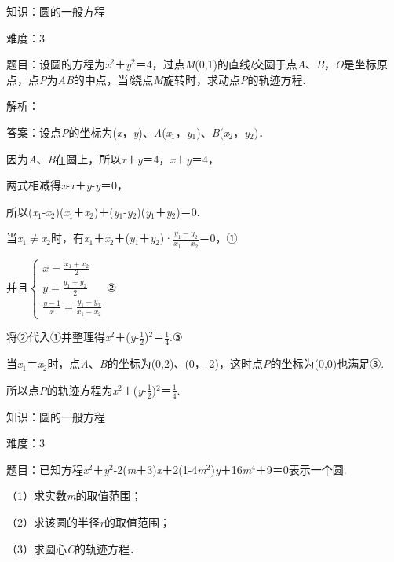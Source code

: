 \documentclass{article} %
\begin{document}
知识：圆的一般方程

难度：3

题目：设圆的方程为\textit{x}${}^{2}$＋\textit{y}${}^{2}$＝4，过点\textit{M}(0,1)的直线\textit{l}交圆于点\textit{A}、\textit{B}，\textit{O}是坐标原点，点\textit{P}为\textit{AB}的中点，当\textit{l}绕点\textit{M}旋转时，求动点\textit{P}的轨迹方程.

解析：

答案：设点\textit{P}的坐标为(\textit{x}，\textit{y})、\textit{A}(\textit{x}${}_{1}$，\textit{y}${}_{1}$)、\textit{B}(\textit{x}${}_{2}$，\textit{y}${}_{2}$)．

因为\textit{A}、\textit{B}在圆上，所以\textit{x}＋\textit{y}＝4，\textit{x}＋\textit{y}＝4，

两式相减得\textit{x}-\textit{x}＋\textit{y}-\textit{y}＝0，

所以(\textit{x}${}_{1}$-\textit{x}${}_{2}$)(\textit{x}${}_{1}$＋\textit{x}${}_{2}$)＋(\textit{y}${}_{1}$-\textit{y}${}_{2}$)(\textit{y}${}_{1}$＋\textit{y}${}_{2}$)＝0.

当\textit{x}${}_{1}$$\mathrm{\neq}$\textit{x}${}_{2}$时，有\textit{x}${}_{1}$＋\textit{x}${}_{2}$＋(\textit{y}${}_{1}$＋\textit{y}${}_{2}$)·$\frac{y_1-y_2}{x_1-x_2}$＝0，①

并且$\left\{\begin{array}{r} x=\frac{x_1+x_2}{2}\\ y=\frac{y_1+y_2}{2}\\ \frac{y-1}{x}=\frac{y_1-y_2}{x_1-x_2} \end{array} \right.$②

将②代入①并整理得\textit{x}${}^{2}$＋(\textit{y}-$\frac{1}{2}$)${}^{2}$＝$\frac{1}{4}$.③

当\textit{x}${}_{1}$＝\textit{x}${}_{2}$时，点\textit{A}、\textit{B}的坐标为(0,2)、(0，-2)，这时点\textit{P}的坐标为(0,0)也满足③.

所以点\textit{P}的轨迹方程为\textit{x}${}^{2}$＋(\textit{y}-$\frac{1}{2}$)${}^{2}$＝$\frac{1}{4}$.

知识：圆的一般方程

难度：3

题目：已知方程\textit{x}${}^{2}$＋\textit{y}${}^{2}$-2(\textit{m}＋3)\textit{x}＋2(1-4\textit{m}${}^{2}$)\textit{y}＋16\textit{m}${}^{4}$＋9＝0表示一个圆.

（1）求实数\textit{m}的取值范围；

（2）求该圆的半径\textit{r}的取值范围；

（3）求圆心\textit{C}的轨迹方程．
\end{document}
